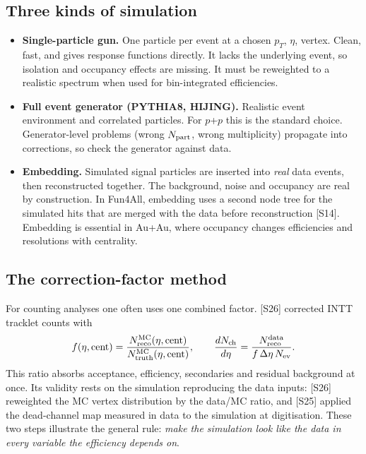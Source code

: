\documentclass[11pt,letterpaper]{article}
\begin{document}
\subsection{Three kinds of simulation}
\begin{itemize}
\item \textbf{Single-particle gun.} One particle per event at a chosen $p_T$, $\eta$, vertex. Clean, fast, and gives response
functions directly. It lacks the underlying event, so isolation and occupancy effects are missing. It must be reweighted to a
realistic spectrum when used for bin-integrated efficiencies.
\item \textbf{Full event generator (PYTHIA8, HIJING).} Realistic event environment and correlated particles. For $p$+$p$ this is
the standard choice. Generator-level problems (wrong $N_{\rm part}$, wrong multiplicity) propagate into corrections, so check the
generator against data.
\item \textbf{Embedding.} Simulated signal particles are inserted into \emph{real} data events, then reconstructed together. The
background, noise and occupancy are real by construction. In Fun4All, embedding uses a second node tree for the simulated hits that
are merged with the data before reconstruction [S14]. Embedding is essential in Au+Au, where occupancy changes efficiencies and
resolutions with centrality.
\end{itemize}

\subsection{The correction-factor method}
For counting analyses one often uses one combined factor. [S26] corrected INTT tracklet counts with
\begin{equation}
f(\eta,\mathrm{cent}) = \frac{N_{\rm reco}^{\rm MC}(\eta,\mathrm{cent})}{N_{\rm truth}^{\rm MC}(\eta,\mathrm{cent})},\qquad
\frac{dN_{\rm ch}}{d\eta}=\frac{N^{\rm data}_{\rm reco}}{f\,\Delta\eta\,N_{\rm ev}} .
\end{equation}
This ratio absorbs acceptance, efficiency, secondaries and residual background at once. Its validity rests on the simulation
reproducing the data inputs: [S26] reweighted the MC vertex distribution by the data/MC ratio, and [S25] applied the dead-channel map
measured in data to the simulation at digitisation. These two steps illustrate the general rule: \emph{make the simulation look like
the data in every variable the efficiency depends on}.
\end{document}
